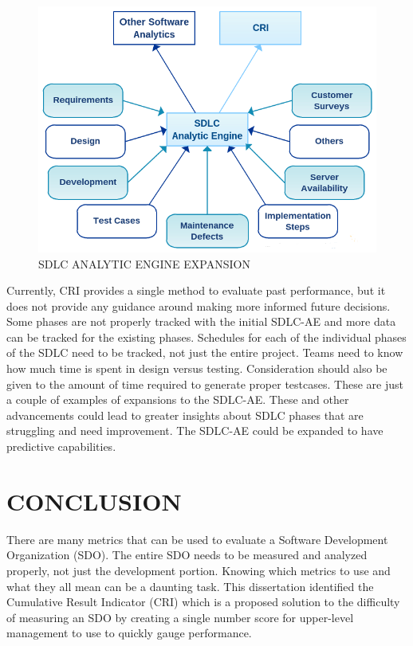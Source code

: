 \documentclass[SDSUThesis.tex]{subfiles}
\begin{document}
    \begin{figure}[ht]
    \includegraphics[scale=.75]{images/sdlcae-adv.png}
    \caption{SDLC ANALYTIC ENGINE EXPANSION}
    \label{fig:sdlc-ae-adv}
    \end{figure}
    
    Currently, CRI provides a single method to evaluate past 
    performance, but it does not
    provide any guidance around making more informed future decisions. 
    Some phases are not properly tracked with the initial SDLC-AE and more
    data can be tracked for the existing phases.
    Schedules for each of the individual phases of the SDLC need to be tracked,
    not just the entire project.  Teams need to know how much time is spent
    in design versus testing.  Consideration should also be given to the amount
    of time required to generate
    proper testcases.  These are just a couple of examples of expansions
    to the SDLC-AE.  These and other advancements could lead to greater
    insights about SDLC phases that are struggling and need improvement.
    The SDLC-AE could be expanded to have predictive capabilities.


\section{CONCLUSION}

    There are many metrics that can be used to evaluate a Software
    Development Organization (SDO). The entire SDO needs to be measured 
    and analyzed properly, not just the development portion. 
    Knowing which metrics to use and what they all mean can be a daunting task.  
    This dissertation identified the Cumulative Result Indicator (CRI) which is a
    proposed solution to the difficulty of measuring an SDO by creating a
    single number score for upper-level management to use to quickly gauge
    performance. 
    
\end{document}
